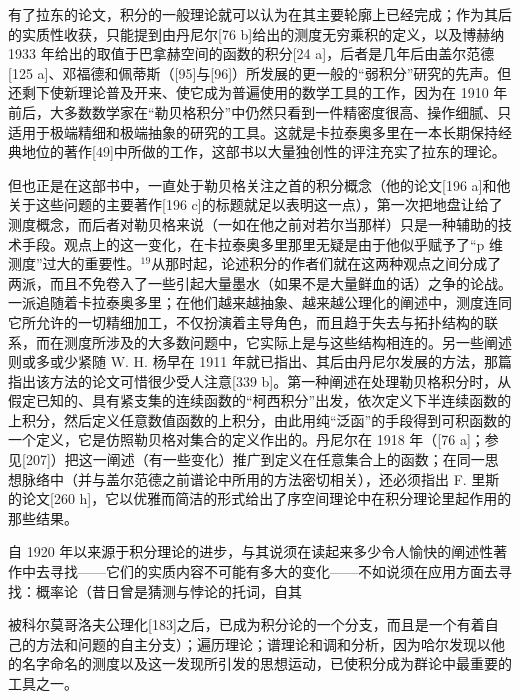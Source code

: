 有了拉东的论文，积分的一般理论就可以认为在其主要轮廓上已经完成；作为其后的实质性收获，只能提到由丹尼尔{[}76 b{]}给出的测度无穷乘积的定义，以及博赫纳 1933 年给出的取值于巴拿赫空间的函数的积分{[}24 a{]}，后者是几年后由盖尔范德{[}125 a{]}、邓福德和佩蒂斯（{[}95{]}与{[}96{]}）所发展的更一般的“弱积分”研究的先声。但还剩下使新理论普及开来、使它成为普遍使用的数学工具的工作，因为在 1910 年前后，大多数数学家在“勒贝格积分”中仍然只看到一件精密度很高、操作细腻、只适用于极端精细和极端抽象的研究的工具。这就是卡拉泰奥多里在一本长期保持经典地位的著作{[}49{]}中所做的工作，这部书以大量独创性的评注充实了拉东的理论。

但也正是在这部书中，一直处于勒贝格关注之首的积分概念（他的论文{[}196 a{]}和他关于这些问题的主要著作{[}196 c{]}的标题就足以表明这一点），第一次把地盘让给了测度概念，而后者对勒贝格来说（一如在他之前对若尔当那样）只是一种辅助的技术手段。观点上的这一变化，在卡拉泰奥多里那里无疑是由于他似乎赋予了“p 维测度”过大的重要性。\(^{19}\)从那时起，论述积分的作者们就在这两种观点之间分成了两派，而且不免卷入了一些引起大量墨水（如果不是大量鲜血的话）之争的论战。一派追随着卡拉泰奥多里；在他们越来越抽象、越来越公理化的阐述中，测度连同它所允许的一切精细加工，不仅扮演着主导角色，而且趋于失去与拓扑结构的联系，而在测度所涉及的大多数问题中，它实际上是与这些结构相连的。另一些阐述则或多或少紧随 W. H. 杨早在 1911 年就已指出、其后由丹尼尔发展的方法，那篇指出该方法的论文可惜很少受人注意{[}339 b{]}。第一种阐述在处理勒贝格积分时，从假定已知的、具有紧支集的连续函数的“柯西积分”出发，依次定义下半连续函数的上积分，然后定义任意数值函数的上积分，由此用纯“泛函”的手段得到可积函数的一个定义，它是仿照勒贝格对集合的定义作出的。丹尼尔在 1918 年（{[}76 a{]}；参见{[}207{]}）把这一阐述（有一些变化）推广到定义在任意集合上的函数；在同一思想脉络中（并与盖尔范德之前谱论中所用的方法密切相关），还必须指出 F. 里斯的论文{[}260 h{]}，它以优雅而简洁的形式给出了序空间理论中在积分理论里起作用的那些结果。

自 1920 年以来源于积分理论的进步，与其说须在读起来多少令人愉快的阐述性著作中去寻找——它们的实质内容不可能有多大的变化——不如说须在应用方面去寻找：概率论（昔日曾是猜测与悖论的托词，自其

被科尔莫哥洛夫公理化{[}183{]}之后，已成为积分论的一个分支，而且是一个有着自己的方法和问题的自主分支）；遍历理论；谱理论和调和分析，因为哈尔发现以他的名字命名的测度以及这一发现所引发的思想运动，已使积分成为群论中最重要的工具之一。
\relax{}
